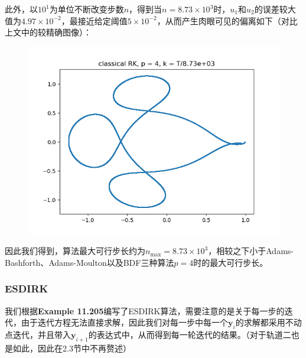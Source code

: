 \documentclass{ctexart}
\begin{document}
\begin{sloppypar}
此外，以$10^1$为单位不断改变步数$n$，得到当$n = 8.73 \times 10^3$时，$u_1$和$u_2$的误差较大值为$4.97 \times 10^{-2}$，最接近给定阈值$5 \times 10^{-2}$，从而产生肉眼可见的偏离如下（对比上文中的较精确图像）：
\begin{figure}[H]
\centering
\includegraphics[scale = 0.45]{./report_src/Figure_26.png}
\end{figure}
因此我们得到，算法最大可行步长约为$n_{\max} = 8.73 \times 10^3$，相较之下小于Adams-Bashforth、Adams-Moulton以及BDF三种算法$p=4$时的最大可行步长。

\subsubsection{ESDIRK}
我们根据\textbf{Example 11.205}编写了ESDIRK算法，需要注意的是关于每一步的迭代，由于迭代方程无法直接求解，因此我们对每一步中每一个$\mathbf{y}_i$的求解都采用不动点迭代，并且带入$\mathbf{y}_{i+1}$的表达式中，从而得到每一轮迭代的结果。（对于轨道二也是如此，因此在2.3节中不再赘述）


\end{sloppypar}
\end{document}
